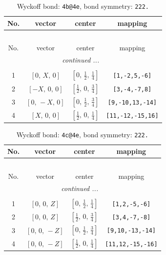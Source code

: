 \documentclass[fleqn,8pt]{jsarticle}
\begin{document}
\begin{longtable}{cccc}
\caption{Wyckoff bond: {\tt 4b@4e}, bond symmetry: {\tt 222.}}
 \\
 \hline \hline
No. & vector & center & mapping \\ \hline \endfirsthead

\multicolumn{3}{l}{\tablename\ \thetable{}} \\
 \hline \hline
No. & vector & center & mapping \\ \hline \endhead

 \hline \hline
\multicolumn{3}{r}{\footnotesize\it continued ...} \\ \endfoot

 \hline \hline
\multicolumn{3}{r}{} \\ \endlastfoot

1 & $\left[ 0,\, X,\, 0 \right]$ & $\left[ 0,\, \frac{1}{2},\, \frac{1}{4} \right]$ & {\tt [1,-2,5,-6]} \\ \hline
2 & $\left[ - X,\, 0,\, 0 \right]$ & $\left[ \frac{1}{2},\, 0,\, \frac{3}{4} \right]$ & {\tt [3,-4,-7,8]} \\ \hline
3 & $\left[ 0,\, - X,\, 0 \right]$ & $\left[ 0,\, \frac{1}{2},\, \frac{3}{4} \right]$ & {\tt [9,-10,13,-14]} \\ \hline
4 & $\left[ X,\, 0,\, 0 \right]$ & $\left[ \frac{1}{2},\, 0,\, \frac{1}{4} \right]$ & {\tt [11,-12,-15,16]} \\
\end{longtable}
\renewcommand{\arraystretch}{1.2}
\begin{longtable}{cccc}
\caption{Wyckoff bond: {\tt 4c@4e}, bond symmetry: {\tt 222.}}
 \\
 \hline \hline
No. & vector & center & mapping \\ \hline \endfirsthead

\multicolumn{3}{l}{\tablename\ \thetable{}} \\
 \hline \hline
No. & vector & center & mapping \\ \hline \endhead

 \hline \hline
\multicolumn{3}{r}{\footnotesize\it continued ...} \\ \endfoot

 \hline \hline
\multicolumn{3}{r}{} \\ \endlastfoot

1 & $\left[ 0,\, 0,\, Z \right]$ & $\left[ 0,\, \frac{1}{2},\, \frac{1}{4} \right]$ & {\tt [1,2,-5,-6]} \\ \hline
2 & $\left[ 0,\, 0,\, Z \right]$ & $\left[ \frac{1}{2},\, 0,\, \frac{3}{4} \right]$ & {\tt [3,4,-7,-8]} \\ \hline
3 & $\left[ 0,\, 0,\, - Z \right]$ & $\left[ 0,\, \frac{1}{2},\, \frac{3}{4} \right]$ & {\tt [9,10,-13,-14]} \\ \hline
4 & $\left[ 0,\, 0,\, - Z \right]$ & $\left[ \frac{1}{2},\, 0,\, \frac{1}{4} \right]$ & {\tt [11,12,-15,-16]} \\
\end{longtable}
\end{document}

